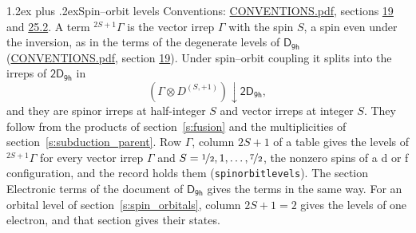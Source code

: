 \documentclass[10pt,a4paper]{article}
\makeatletter
\renewcommand\section{\@startsection{section}{1}{\z@}{-3ex plus -1ex minus -.2ex}%
  {1.2ex plus .2ex}{\normalfont\large\sffamily\bfseries\color{parttitle}}}
\numberwithin{equation}{section}
\newcommand{\grp}[1]{\mathsf{#1}}
\newcommand{\restr}[2]{#1\!\downarrow#2}
\newcommand{\irrJp}[2]{D^{(#1,#2)}}
\newcommand{\irrprod}{\otimes}
\newcommand{\term}[2]{{}^{#1}#2}
\makeatother
\begin{document}
\section{Spin--orbit levels}\label{s:spin_orbit}
Conventions: \href{../../CONVENTIONS.pdf}{CONVENTIONS.pdf}, sections \href{../../../rotation/CONVENTIONS.pdf\#conv.19}{19} and \href{../../CONVENTIONS.pdf\#conv.25.2}{25.2}.
\leavevmode\label{n:local.spin}\label{n:symbol.term}A term $\term{2S+1}{\Gamma}$ is the vector irrep $\Gamma$ with the spin $S$, a spin even under the inversion, as in the terms of the degenerate levels of \href{../../../rotation/data/pdf/D9h.pdf}{$\grp{D_{9h}}$} (\href{../../CONVENTIONS.pdf}{CONVENTIONS.pdf}, section \href{../../../rotation/CONVENTIONS.pdf\#conv.19}{19}). Under spin--orbit coupling it splits into the irreps of $\grp{2D_{9h}}$ in
\begin{equation}\label{e:spinorbit}\restr{(\Gamma \irrprod \irrJp{S}{+1})}{\grp{2D_{9h}}},\end{equation}
and they are spinor irreps at half-integer $S$ and vector irreps at integer $S$. They follow from the products of section~\ref{s:fusion} and the multiplicities of section~\ref{s:subduction_parent}. Row $\Gamma$, column $2S + 1$ of a table gives the levels of $\term{2S+1}{\Gamma}$ for every vector irrep $\Gamma$ and $S = \nicefrac{1}{2}, 1, \dots, \nicefrac{7}{2}$, the nonzero spins of a d or f configuration, and the record holds them (\texttt{spinorbitlevels}). The section Electronic terms of the document of \href{../../../rotation/data/pdf/D9h.pdf}{$\grp{D_{9h}}$} gives the terms in the same way. For an orbital level of section~\ref{s:spin_orbitals}, column $2S + 1 = 2$ gives the levels of one electron, and that section gives their states.
\end{document}
